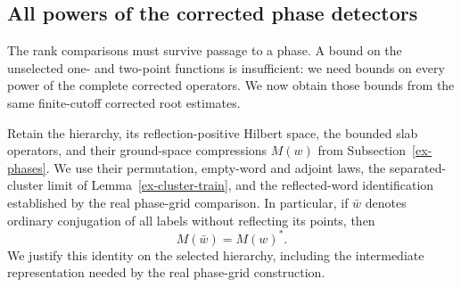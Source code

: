 \subsection{All powers of the corrected phase detectors}
\label{sec:actual-phase-detector-moments}

The rank comparisons must survive passage to a phase. A bound on the
unselected one- and two-point functions is insufficient: we need bounds
on every power of the complete corrected operators. We now obtain those
bounds from the same finite-cutoff corrected root estimates.

Retain the hierarchy, its reflection-positive Hilbert space, the bounded
slab operators, and their ground-space compressions $M(w)$ from
Subsection~\ref{ex-phases}. We use their permutation, empty-word and adjoint
laws, the separated-cluster limit of Lemma~\ref{ex-cluster-train}, and
the reflected-word identification established by the real phase-grid
comparison. In particular, if $\bar w$ denotes ordinary conjugation of
all labels without reflecting its points, then
\begin{equation}\label{eq:episode-conjugate}
                         M(\bar w)=M(w)^*.
\end{equation}
We justify this identity on the selected hierarchy, including the
intermediate representation needed by the real phase-grid construction.

